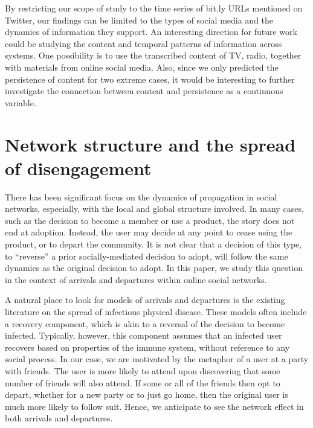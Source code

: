 \documentclass[phd,tocprelim]{cornell}
\begin{document}
By restricting our scope of study to the time series of bit.ly URLs mentioned on Twitter, our findings can be limited to the types of social media and the dynamics of information they support. An interesting direction for future work could be studying the content and temporal patterns of information across systems. One possibility is to use the transcribed content of TV, radio, together with materials from online social media. Also, since we only predicted the persistence of content for two extreme cases, it would be interesting to further investigate the connection between content and persistence as a continuous variable.


\chapter{Network structure and the spread of disengagement}
\label{chap:network}


There has been significant focus on the dynamics of propagation in social networks, especially, with the local and global structure involved\cite{Newman:2002,Dodds:2005,Bakshy-2011,Leskovec:2007,Backstrom:2006,Romero-2011,Nowell-2008,Gruhl-2004}. In many cases, such as the decision to become a member or use a product, the story does not end at
adoption.  Instead, the user may decide at any point to cease using
the product, or to depart the community.  It is not clear that a
decision of this type, to ``reverse'' a prior socially-mediated
decision to adopt, will follow the same dynamics as the original
decision to adopt.  In this paper, we study this question in the
context of arrivals and departures within online social networks.

A natural place to look for models of arrivals and departures is the
existing literature on the spread of infectious physical disease.
These models often include a recovery component\cite{Newman:2002,
  Dodds:2005}, which is akin to a reversal of the decision to become
infected.  Typically, however, this component assumes that an infected
user recovers based on properties of the immune system, without
reference to any social process.  In our case, we are motivated by the
metaphor of a user at a party with friends.  The user is more likely
to attend upon discovering that some number of friends will also
attend.  If some or all of the friends then opt to depart, whether for
a new party or to just go home, then the original user is
much more likely to follow suit.  Hence, we anticipate to see the network effect in both arrivals and departures.
\end{document}
